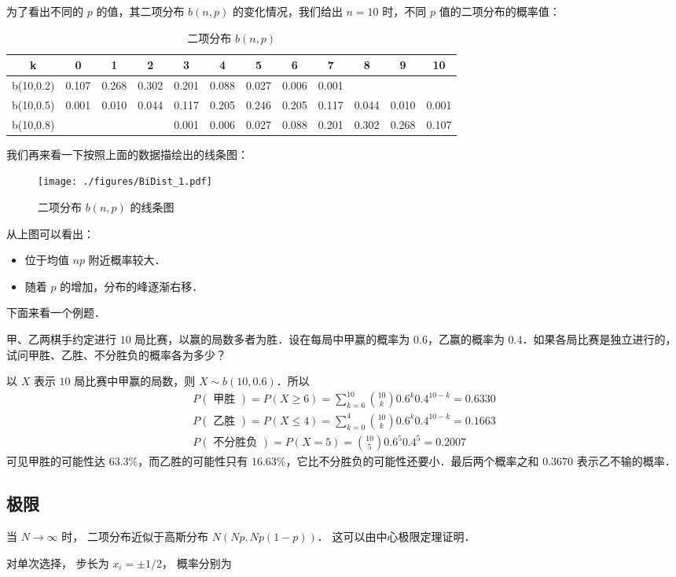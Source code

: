 为了看出不同的 $p $ 的值，其二项分布 $b(n ,p) $ 的变化情况，我们给出 $n=10$ 时，不同 $p $ 值的二项分布的概率值：
\begin{table}[ht]
\centering
\caption{二项分布 $b(n, p)$}\label{BiDist_tab1}
\begin{tabular}{|c|c|c|c|c|c|c|c|c|c|c|c|}
\hline
k & 0 & 1 & 2 & 3 & 4 & 5 & 6 & 7 & 8 & 9 & 10 \\
\hline
b(10,0.2) & 0.107 & 0.268 & 0.302 & 0.201 & 0.088 & 0.027 & 0.006 & 0.001 & & & \\
\hline
b(10,0.5) & 0.001 & 0.010 & 0.044 & 0.117 & 0.205 & 0.246 & 0.205 & 0.117 & 0.044 & 0.010 & 0.001 \\
\hline
b(10,0.8) & & & & 0.001 & 0.006 & 0.027 & 0.088 & 0.201 & 0.302 & 0.268 & 0.107 \\
\hline
\end{tabular}
\end{table}
我们再来看一下按照上面的数据描绘出的线条图：
\begin{figure}[ht]
\centering
\texttt{[image: ./figures/BiDist\_1.pdf]}
\caption{二项分布 $b(n,p)$ 的线条图} \label{BiDist_fig1}
\end{figure}

从上图可以看出：
\begin{itemize}
\item 位于均值 $np$ 附近概率较大．
\item 随着 $p $ 的增加，分布的峰逐渐右移．
\end{itemize}

下面来看一个例题．
\begin{example}{}
甲、乙两棋手约定进行 $10 $ 局比赛，以赢的局数多者为胜．设在每局中甲赢的概率为 $0.6$，乙赢的概率为 $0. 4$．如果各局比赛是独立进行的，试问甲胜、乙胜、不分胜负的概率各为多少？

以 $X $ 表示 $10 $ 局比赛中甲赢的局数，则 $X\sim b(10,0. 6)$．所以
\begin{equation}
\begin{aligned}P(\text { 甲胜 })=P(X \geqslant 6)=\sum_{k=6}^{10}\binom{10}{k} 0.6^{k} 0.4^{10-k}=0.6330 \\ P(\text { 乙胜 })=P(X \leqslant 4)=\sum_{k=0}^{4}\binom{10}{k} 0.6^{k} 0.4^{10-k}=0.1663 \\ P(\text { 不分胜负 })=P(X=5)=\binom{10}{5} 0.6^{5} 0.4^{5}=0.2007\end{aligned}
\end{equation}
可见甲胜的可能性达 $63. 3\%$，而乙胜的可能性只有 $16. 63\% $，它比不分胜负的可能性还要小．最后两个概率之和 $0. 367 0 $ 表示乙不输的概率．
\end{example}

\subsection{极限}
当 $N\to\infty$ 时， 二项分布近似于高斯分布 $N(Np, Np(1-p))$． 这可以由中心极限定理证明．

对单次选择， 步长为 $x_i = \pm 1/2$， 概率分别为

